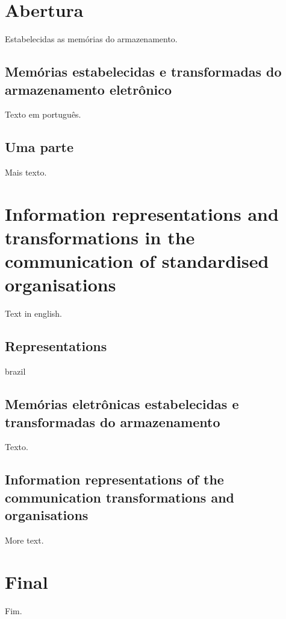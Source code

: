 \documentclass{report}
\begin{document}
\tableofcontents
\chapter{Abertura}
Estabelecidas as mem\'orias do armazenamento.
\section{Mem\'orias estabelecidas e transformadas do armazenamento eletr\^onico}
Texto em português.
\section{Uma parte}
Mais texto.

\chapter{Information representations and transformations in the communication of standardised organisations}
Text in english.
\section{Representations}
\begin{otherlanguage*}{brazil}
\section{Mem\'orias eletr\^onicas estabelecidas e transformadas do armazenamento}
Texto.
\end{otherlanguage*}
\section{Information representations of the communication transformations and organisations}
More text.

\chapter{Final}
Fim.
\end{document}
